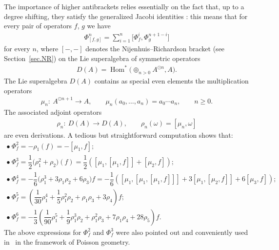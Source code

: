 \documentclass[11pt]{article}
\newcommand{\Hom}{\operatorname{Hom}}
\numberwithin{equation}{section}
\begin{document}
The importance of higher antibrackets relies essentially on the fact that, up to a degree shifting, they satisfy the generalized Jacobi identities \cite{BDA,kravchenko2000}: this means that for every pair of operators
$f$, $g$ we have
\begin{gather*} \Phi^{n}_{[f,g]}=\sum_{i=1}^n\big[\Phi_f^i,\Phi_g^{n+1-i}\big]\end{gather*}
for every $n$, where $[-,-]$ denotes the Nijenhuis--Richardson bracket (see Section~\ref{sec.NR}) on the Lie superalgebra of symmetric operators
\begin{gather*}D(A)=\Hom^*\big(\oplus_{n>0}A^{\odot n},A\big) .\end{gather*}
The Lie superalgebra $D(A)$ contains as special even elements the multiplication operators
\begin{gather*} \mu_n\colon \ A^{\odot n+1}\to A,\qquad \mu_n(a_0,\ldots,a_n)=a_0\cdots a_n ,\qquad n\ge 0 .\end{gather*}
The associated adjoint operators
\begin{gather*} \rho_n\colon \ D(A)\to D(A),\qquad \rho_n(\omega)=[\mu_n,\omega]  \end{gather*}
are even derivations. A tedious but straightforward computation shows that:
\begin{gather*}
\bullet \ \Phi^2_f=-\rho_1(f)=-[\mu_1,f];\\
\bullet \ \Phi^3_f=\dfrac{1}{2}\big(\rho_1^2+\rho_2\big)(f)=\dfrac{1}{2}([\mu_1,[\mu_1,f]]+[\mu_2,f]);\\
\bullet \ \Phi^4_f=-\dfrac{1}{6}\big(\rho_1^3+3\rho_1\rho_2+6\rho_3\big)f=
-\dfrac{1}{6}([\mu_1,[\mu_1,[\mu_1,f]]]+3[\mu_1,[\mu_2,f]]+6[\mu_3,f]);\\
\bullet \ \Phi^5_f=\left(\dfrac{1}{30}\rho_1^4+\dfrac{1}{5}\rho_1^2\rho_2+\rho_1\rho_3+3\rho_4\right)f;\\
\bullet \ \Phi^6_f=-\dfrac{1}{3}\left(\dfrac{1}{90}\rho_1^5+\dfrac{1}{9}\rho_1^3\rho_2+\rho_1^2\rho_3+7\rho_1\rho_4+28\rho_5\right)f.
\end{gather*}
The above expressions for $\Phi^2_f$ and $\Phi^3_f$ were also pointed out and conveniently used in~\cite{FMpoisson} in the framework of Poisson geometry.
\end{document}
